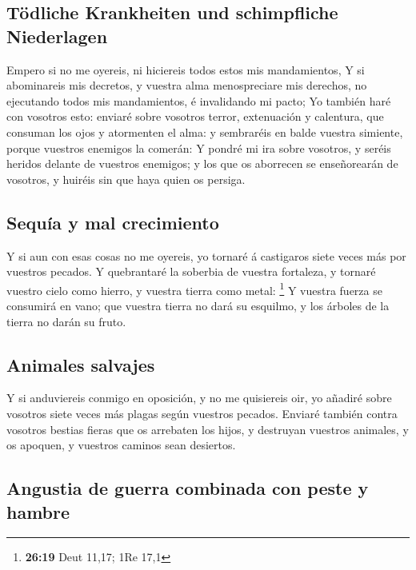 \hypertarget{tuxf6dliche-krankheiten-und-schimpfliche-niederlagen}{%
\subsection{Tödliche Krankheiten und schimpfliche
Niederlagen}\label{tuxf6dliche-krankheiten-und-schimpfliche-niederlagen}}

 Empero si no me oyereis, ni hiciereis todos estos mis
mandamientos,  Y si abominareis mis decretos, y vuestra
alma menospreciare mis derechos, no ejecutando todos mis mandamientos, é
invalidando mi pacto;  Yo también haré con vosotros esto:
enviaré sobre vosotros terror, extenuación y calentura, que consuman los
ojos y atormenten el alma: y sembraréis en balde vuestra simiente,
porque vuestros enemigos la comerán:  Y pondré mi ira
sobre vosotros, y seréis heridos delante de vuestros enemigos; y los que
os aborrecen se enseñorearán de vosotros, y huiréis sin que haya quien
os persiga.

\hypertarget{sequuxeda-y-mal-crecimiento}{%
\subsection{Sequía y mal
crecimiento}\label{sequuxeda-y-mal-crecimiento}}

 Y si aun con esas cosas no me oyereis, yo tornaré á
castigaros siete veces más por vuestros pecados.  Y
quebrantaré la soberbia de vuestra fortaleza, y tornaré vuestro cielo
como hierro, y vuestra tierra como metal: \footnote{\textbf{26:19} Deut
  11,17; 1Re 17,1}  Y vuestra fuerza se consumirá en
vano; que vuestra tierra no dará su esquilmo, y los árboles de la tierra
no darán su fruto.

\hypertarget{animales-salvajes}{%
\subsection{Animales salvajes}\label{animales-salvajes}}

 Y si anduviereis conmigo en oposición, y no me
quisiereis oir, yo añadiré sobre vosotros siete veces más plagas según
vuestros pecados.  Enviaré también contra vosotros
bestias fieras que os arrebaten los hijos, y destruyan vuestros
animales, y os apoquen, y vuestros caminos sean desiertos.

\hypertarget{angustia-de-guerra-combinada-con-peste-y-hambre}{%
\subsection{Angustia de guerra combinada con peste y
hambre}\label{angustia-de-guerra-combinada-con-peste-y-hambre}}

